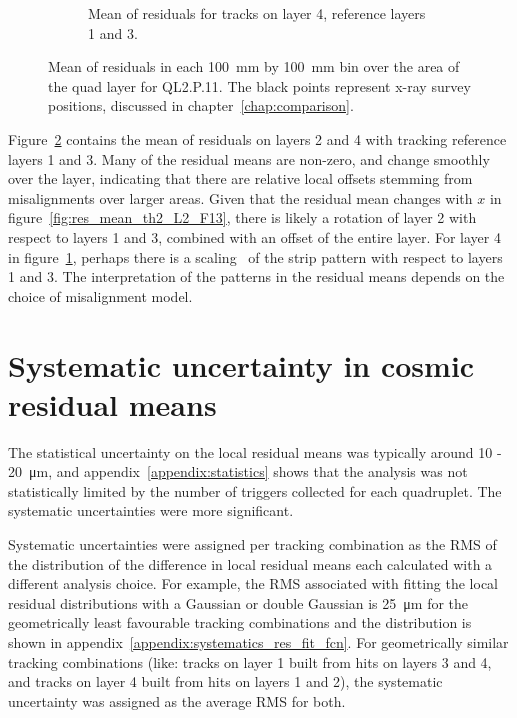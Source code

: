 \begin{figure}
\begin{subfigure}{0.85\textwidth}
  \caption{Mean of residuals for tracks on layer 4, reference layers 1 and 3.}
  \label{fig:res_mean_th2_L4_F13}
\end{subfigure}
\caption{Mean of residuals in each \SI{100}{\milli\meter} by \SI{100}{\milli\meter} bin over the area of the quad layer for QL2.P.11. The black points represent x-ray survey positions, discussed in chapter~\ref{chap:comparison}.}
\label{fig:res_mean_th2}
\end{figure}

Figure~\ref{fig:res_mean_th2} contains the mean of residuals on layers 2 and 4 with tracking reference layers 1 and 3. Many of the residual means are non-zero, and change smoothly over the layer, indicating that there are relative local offsets stemming from misalignments over larger areas. Given that the residual mean changes with $x$ in figure~\ref{fig:res_mean_th2_L2_F13}, there is likely a rotation of layer 2 with respect to layers 1 and 3, combined with an offset of the entire layer. For layer 4 in figure~\ref{fig:res_mean_th2_L4_F13}, perhaps there is a scaling~\cite{carlson_results_2019} of the strip pattern with respect to layers 1 and 3. The interpretation of the patterns in the residual means depends on the choice of misalignment model.

\section{Systematic uncertainty in cosmic residual means}

The statistical uncertainty on the local residual means was typically around \SI{10}{} - \SI{20}{\micro\meter}, and appendix~\ref{appendix:statistics} shows that the analysis was not statistically limited by the number of triggers collected for each quadruplet. The systematic uncertainties were more significant. 

Systematic uncertainties were assigned per tracking combination as the RMS of the distribution of the difference in local residual means each calculated with a different analysis choice. For example, the RMS associated with fitting the local residual distributions with a Gaussian or double Gaussian is \SI{25}{\micro\meter} for the geometrically least favourable tracking combinations and the distribution is shown in appendix~\ref{appendix:systematics_res_fit_fcn}. For geometrically similar tracking combinations (like: tracks on layer 1 built from hits on layers 3 and 4, and tracks on layer 4 built from hits on layers 1 and 2), the systematic uncertainty was assigned as the average RMS for both.

